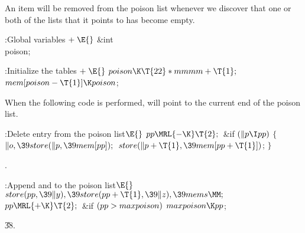 An item will be removed from the poison list whenever we discover that one
or both of the lists that it points to has become empty.

\Y\B\4:Global variables\X${}\mathrel+\E{}$\6
\&{int} \\{poison};\par
\fi

\B{}:Initialize the tables\X${}\mathrel+\E{}$\6
$\\{poison}\K\T{22}*\\{mmmm}+\T{1};{}$\6
${}\\{mem}[\\{poison}-\T{1}]\K\\{poison}{}$;\par
\fi

When the following code is performed,  will point to the
current end of the poison list.

\Y\B\4:Delete entry  from the poison list\X${}\E{}$\6
$\\{pp}\MRL{-{\K}}\T{2};{}$\6
\&{if} ${}(\|p\I\\{pp}){}$\5
${}\{{}$\1\6
${}\|o,\39\\{store}(\|p,\39\\{mem}[\\{pp}]);{}$\6
${}\\{store}(\|p+\T{1},\39\\{mem}[\\{pp}+\T{1}]){}$;\6
\4${}\}{}$\2\par
{}.\fi

\B{}:Append  and  to the poison list\X${}\E{}$\6
$\\{store}(\\{pp},\39\|y),\39\\{store}(\\{pp}+\T{1},\39\|z),\39\\{mems}\MM;{}$\6
${}\\{pp}\MRL{+{\K}}\T{2};{}$\6
\&{if} ${}(\\{pp}>\\{maxpoison}){}$\1\5
${}\\{maxpoison}\K\\{pp}{}$;\2\par
\U38.\fi

